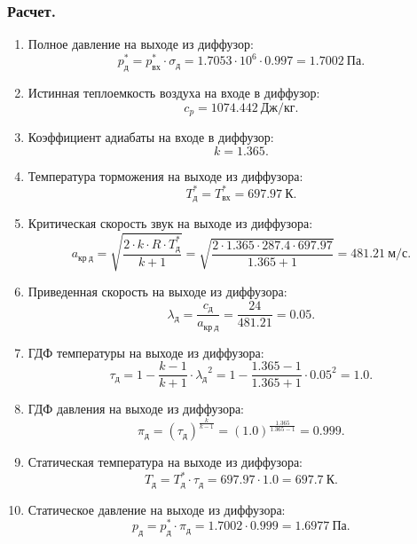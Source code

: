 \documentclass[a4paper,12pt]{article}
\begin{document}
    \subsubsection{Расчет.}
%    
    \begin{enumerate}
    	\item Полное давление на выходе из диффузор:
    	\[
    		p_д^* = p_{вх}^* \cdot \sigma_д = 1.7053 \cdot 10^6 \cdot 0.997 = 
    		1.7002\ Па.
    	\]

    	\item Истинная теплоемкость воздуха на входе в диффузор:
    	\[
    		c_p = 1074.442\ Дж/кг.
    	\]

    	\item Коэффициент адиабаты на входе в диффузор:
    	\[
    		k = 1.365.
    	\]

    	\item Температура торможения на выходе из диффузора:
    	\[
    		T_{д}^* = T_{вх}^* = 697.97\ К.
    	\]

    	\item Критическая скорость звук на выходе из диффузора:
    	\[
    		a_{кр\ д} = \sqrt{ \frac{2 \cdot k \cdot R \cdot T_{д}^*}{k + 1} } =
    		\sqrt{ \frac{
    				2 \cdot 1.365 \cdot 287.4 \cdot 697.97
    				}{
    				1.365 + 1
    		} } =
    		481.21\ м/с.
    	\]

    	\item Приведенная скорость на выходе из диффузора:
    	\[
    		\lambda_д = \frac{c_д}{a_{кр\ д}} = \frac{24}{481.21} = 
    		0.05.
    	\]

    	\item ГДФ температуры на выходе из диффузора:
    	\[
    		\tau_д =  1 - \frac{k - 1}{k + 1} \cdot {\lambda_д}^2  =  
    		1 - \frac{1.365 - 1}{1.365 + 1} 
    		\cdot {0.05}^2  = 
    		1.0.
    	\]

    	\item ГДФ давления на выходе из диффузора:
    	\[
    		\pi_д = \left( \tau_д  \right) ^ \frac{k}{k -1} = 
    		\left( 
    			1.0  
    			\right) ^ \frac{1.365}{1.365 -1} = 
    		0.999.
    	\]

    	\item Статическая температура на выходе из диффузора:
    	\[
    		T_{д} = T_{д}^* \cdot \tau_д = 697.97 \cdot 1.0 = 697.7\ К.
    	\]

    	\item Статическое давление на выходе из диффузора:
    	\[
    		p_{д} = p_д^* \cdot \pi_д = 1.7002 \cdot 0.999 = 
    		1.6977\ Па.
    	\]


\end{enumerate}
\end{document}
